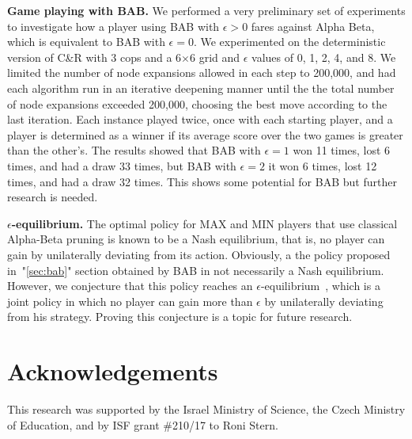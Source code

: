 \documentclass[letterpaper]{article} %
\newcounter{bab}
\begin{document}
\noindent \textbf{Game playing with BAB.} We performed a very preliminary set of experiments to investigate how a player using BAB with $\epsilon>0$ fares against Alpha Beta, which is equivalent to BAB with $\epsilon=0$.
We experimented on the deterministic version of C\&R with 3 cops and a 6$\times$6 grid and $\epsilon$ values of 0, 1, 2, 4, and 8. We limited the number of node expansions allowed in each step to 200,000, and had each algorithm run in an iterative deepening manner until the the total number of node expansions exceeded 200,000, choosing the  best move according to the last iteration.
Each instance played twice, once with each starting player, and a player is determined as a winner if its average score over the two games is greater than the other's.
The results showed that BAB with $\epsilon=1$ won 11 times, lost 6 times, and had a draw 33 times, but BAB with $\epsilon=2$ it won 6 times, lost 12 times, and had a draw 32 times.
This shows some potential for BAB but further research is needed. 

\noindent \textbf{$\epsilon$-equilibrium.} 
The optimal policy for MAX and MIN players that use classical Alpha-Beta pruning is known to be a Nash equilibrium, that is, no player can gain by unilaterally deviating from its action. Obviously, a the policy proposed in~"\ref{sec:bab}" section obtained by BAB in not necessarily a Nash equilibrium. However, we conjecture that this policy reaches an  $\epsilon$-equilibrium~\cite{nisan2007algorithmic}, which is a joint policy in which no player can gain more than $\epsilon$ by unilaterally deviating from his strategy. Proving this conjecture is a topic for future research.





\section{Acknowledgements}
This research was supported by the Israel Ministry of Science, the Czech Ministry of Education, and by ISF grant \#210/17 to Roni Stern.



\end{document}
